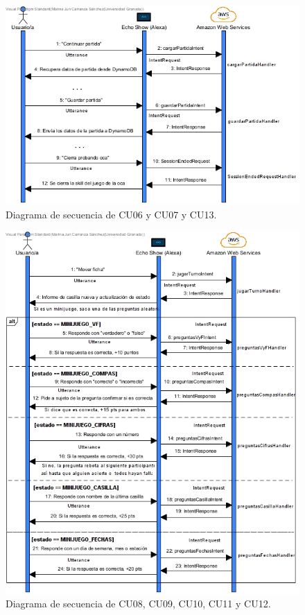 \begin{figure}[H]
	\centering
	\includegraphics[width=1\textwidth]{imgs/DS03.jpg}
	\caption{Diagrama de secuencia de CU06 y CU07 y CU13.}
	\label{fig:DS03}
\end{figure}

\begin{figure}[H]
	\centering
	\includegraphics[width=1\textwidth]{imgs/DS04.jpg}
	\caption{Diagrama de secuencia de CU08, CU09, CU10, CU11 y CU12.}
	\label{fig:DS04}
\end{figure}


